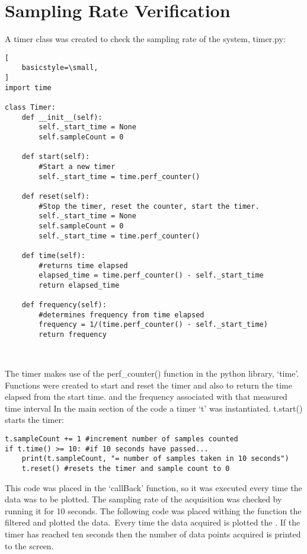 \documentclass{article}
\begin{document}
\section{Sampling Rate Verification}
A timer class was created to check the sampling rate of the system, timer.py:
\begin{lstlisting}[
    basicstyle=\small,
]
import time

class Timer:
    def __init__(self):
        self._start_time = None
        self.sampleCount = 0

    def start(self):
        #Start a new timer
        self._start_time = time.perf_counter()

    def reset(self):
        #Stop the timer, reset the counter, start the timer.
        self._start_time = None
        self.sampleCount = 0
        self._start_time = time.perf_counter()

    def time(self):
        #returns time elapsed
        elapsed_time = time.perf_counter() - self._start_time
        return elapsed_time
    
    def frequency(self):
        #determines frequency from time elapsed
        frequency = 1/(time.perf_counter() - self._start_time)
        return frequency



\end{lstlisting}
The timer makes use of the perf\_counter() function in the python library, `time'. Functions were created to start and reset the timer and also to return the time elapsed from the start time. and the frequency associated with that measured time interval
In the main section of the code a timer `t' was instantiated. t.start() starts the timer:
\lstset{language=Python}
\begin{lstlisting}
t.sampleCount += 1 #increment number of samples counted
if t.time() >= 10: #if 10 seconds have passed...
    print(t.sampleCount, "= number of samples taken in 10 seconds")
    t.reset() #resets the timer and sample count to 0
\end{lstlisting}
This code was placed in the `callBack' function, so it was executed every time the data was to be plotted. The sampling rate of the acquisition was checked by running it for 10 seconds. The following code was placed withing the function the filtered and plotted the data.\
Every time the data acquired is plotted the . If the timer has reached ten seconds then the number of data points acquired is printed to the screen.\\
\newline
\end{document}
